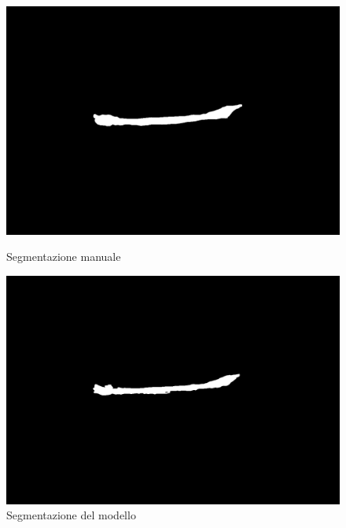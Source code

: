 \begin{figure}[!ht]
    \centering
    \begin{minipage}{0.4\columnwidth}
        \centering
        \includegraphics[width=\linewidth]{Immagini/mask.png}
        \caption{Segmentazione manuale}
        \label{fig:segmentazione manuale}
    \end{minipage}
    \hfill
    \begin{minipage}{0.4\columnwidth}
        \centering
        \includegraphics[width=\linewidth]{Immagini/prediction.png}
        \caption{Segmentazione del modello}
        \label{fig:segmentazione del modello}
    \end{minipage}
\end{figure}


